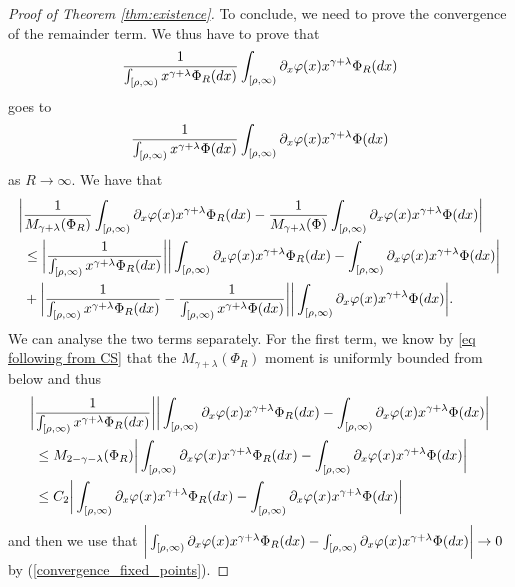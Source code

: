\documentclass[11pt]{article}
\numberwithin{equation}{section}
\theoremstyle{plain}
\newcommand{\der}{\textup{d}}
\begin{document}
\begin{proof}[Proof of Theorem \ref{thm:existence}]
To conclude, we need to prove the convergence of the remainder term. We thus have to prove that
\begin{align*}
 \frac{1}{\int_{[\rho,\infty)}x^{\gamma+\lambda}\Phi_{R}(\der x)}\int_{[\rho,\infty)}\partial_{x}\varphi(x)x^{\gamma+\lambda}\Phi_{R}(\der x)
   \end{align*}
   goes to 
   \begin{align*}
 \frac{1}{\int_{[\rho,\infty)}x^{\gamma+\lambda}\Phi(\der x)}\int_{[\rho,\infty)}\partial_{x}\varphi(x)x^{\gamma+\lambda}\Phi(\der x)
   \end{align*}
 as $R\rightarrow\infty$. We have that
   \begin{align*}
   \bigg| &\frac{1}{M_{\gamma+\lambda}(\Phi_{R})}\int_{[\rho,\infty)}\partial_{x}\varphi(x)x^{\gamma+\lambda}\Phi_{R}(\der x)-\frac{1}{M_{\gamma+\lambda}(\Phi)}\int_{[\rho,\infty)}\partial_{x}\varphi(x)x^{\gamma+\lambda}\Phi(\der x)\bigg|\\
   &\leq    \bigg| \frac{1}{\int_{[\rho,\infty)}x^{\gamma+\lambda}\Phi_{R}(\der x)}\bigg|\bigg|\int_{[\rho,\infty)}\partial_{x}\varphi(x)x^{\gamma+\lambda}\Phi_{R}(\der x)-\int_{[\rho,\infty)}\partial_{x}\varphi(x)x^{\gamma+\lambda}\Phi(\der x)\bigg|\\
   &+   \bigg| \frac{1}{\int_{[\rho,\infty)}x^{\gamma+\lambda}\Phi_{R}(\der x)}-\frac{1}{\int_{[\rho,\infty)}x^{\gamma+\lambda}\Phi(\der x)}\bigg|\bigg|\int_{[\rho,\infty)}\partial_{x}\varphi(x)x^{\gamma+\lambda}\Phi(\der x)\bigg|.
\end{align*}
We can analyse the two terms separately. For the first term, we know by \eqref{eq following from CS} that the $M_{\gamma+\lambda}(\Phi_{R})$ moment is uniformly bounded from below and thus
\begin{align*}
 \bigg|& \frac{1}{\int_{[\rho,\infty)}x^{\gamma+\lambda}\Phi_{R}(\der x)}\bigg|\bigg|\int_{[\rho,\infty)}\partial_{x}\varphi(x)x^{\gamma+\lambda}\Phi_{R}(\der x)-\int_{[\rho,\infty)}\partial_{x}\varphi(x)x^{\gamma+\lambda}\Phi(\der x)\bigg| \\
&\leq M_{2-\gamma-\lambda}(\Phi_{R})\bigg|\int_{[\rho,\infty)} \partial_{x}\varphi(x)x^{\gamma+\lambda}\Phi_{R}(\der x)-\int_{[\rho,\infty)}\partial_{x}\varphi(x)x^{\gamma+\lambda}\Phi(\der x)\bigg|\\
&\leq C_{2}\bigg|\int_{[\rho,\infty)} \partial_{x}\varphi(x)x^{\gamma+\lambda}\Phi_{R}(\der x)-\int_{[\rho,\infty)}\partial_{x}\varphi(x)x^{\gamma+\lambda}\Phi(\der x)\bigg|
\end{align*}
and then we use that $\bigg|\int_{[\rho,\infty)}\partial_{x}\varphi(x)x^{\gamma+\lambda}\Phi_{R}(\der x)-\int_{[\rho,\infty)} \partial_{x}\varphi(x)x^{\gamma+\lambda}\Phi(\der x)\bigg|\rightarrow 0$ by (\ref{convergence_fixed_points}).


\end{proof}
\end{document}
